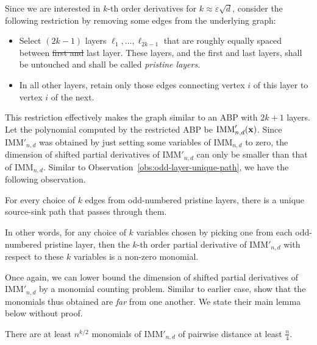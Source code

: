 \documentclass{birkjour}
\renewcommand{\epsilon}{\varepsilon}
\providecommand{\DIFaddtex}[1]{{\protect\color{blue}\uwave{#1}}} %
\providecommand{\DIFdeltex}[1]{{\protect\color{red}\sout{#1}}}                      %
\providecommand{\DIFaddbegin}{} %
\providecommand{\DIFaddend}{} %
\providecommand{\DIFdelbegin}{} %
\providecommand{\DIFdelend}{} %
\providecommand{\DIFadd}[1]{\texorpdfstring{\DIFaddtex{#1}}{#1}} %
\providecommand{\DIFdel}[1]{\texorpdfstring{\DIFdeltex{#1}}{}} %
\begin{document}
Since we are interested in $k$-th order derivatives for $k \approx \epsilon \sqrt{d}$, \cite{FLMS13} consider the following restriction by removing some edges from the underlying graph:
\begin{itemize}
\item Select $(2k-1)$ layers $\ell_1,\dots, \ell_{2k-1}$ that are roughly equally spaced between \DIFdelbegin \DIFdel{first and }\DIFdelend \DIFaddbegin \DIFadd{the first and the }\DIFaddend last layer. These layers, and the first and \DIFaddbegin \DIFadd{the }\DIFaddend last layers, shall be untouched and shall be called \emph{pristine layers}.
\item In all \DIFaddbegin \DIFadd{the }\DIFaddend other layers, retain only those edges connecting vertex $i$ of this layer to vertex $i$  of the next. 
\end{itemize}
This restriction effectively makes the graph similar to an ABP with $2k+1$ layers. Let the polynomial computed by the restricted ABP be $\mathrm{IMM}'_{n,d}(\mathbf{x})$. Since $\mathrm{IMM}'_{n,d}$ was obtained by just setting some variables of $\mathrm{IMM}_{n,d}$ to zero, the dimension of shifted partial derivatives of $\mathrm{IMM}'_{n,d}$ can only be smaller than that of $\mathrm{IMM}_{n,d}$. Similar to Observation~\ref{obs:odd-layer-unique-path}, we have the following observation. 

\begin{observation}
For every choice of $k$ edges from odd-numbered pristine layers, there is a unique source-sink path that passes through them. 

In other words, for any choice of $k$ variables chosen by picking one from each odd-numbered pristine layer, then the $k$-th order partial derivative of $\mathrm{IMM}'_{n,d}$ with respect to these $k$ variables is a non-zero monomial. 
\end{observation}

Once again, we can lower bound the dimension of shifted partial derivatives of $\mathrm{IMM}'_{n,d}$ by a monomial counting problem. Similar to \DIFaddbegin \DIFadd{the }\DIFaddend earlier case, \cite{FLMS13} show that the monomials thus obtained are \emph{far} from one another. We state their main lemma below without proof. 

\begin{lemma}
There are at least $n^{k/2}$ monomials of $\mathrm{IMM}'_{n,d}$ of pairwise distance at least $\frac{n}{4}$. 
\end{lemma}
\end{document}

